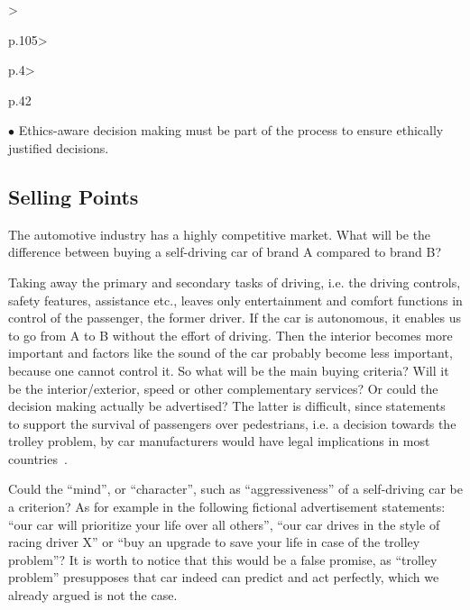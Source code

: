 \begin{table}[t]
\begin{small}
\begin{supertabular}{%
		>{\raggedright}p{.105\textwidth}>{\raggedright}p{.4\textwidth}>{\raggedright}p{.42\textwidth}}
				\noindent $\bullet$ Ethics-aware decision making must be part of the process to ensure ethically justified decisions.
 			 \tabularnewline 					
			\bottomrule
		\end{supertabular}
	\end{small}
	
\end{table}

\subsection{Selling Points}
\label{sec:EAofNONTC:SellingPoints}

The automotive industry has a highly competitive market. What will be the difference between buying a self-driving car of brand A compared to brand B? 

Taking away the primary and secondary tasks of driving, i.e. the driving controls, safety features, assistance etc., leaves only entertainment and comfort functions in control of the passenger, the former driver. If the car is autonomous, it enables us to go from A to B without the effort of driving. Then the interior becomes more important and factors like the sound of the car probably become less important, because one cannot control it. So what will be the main buying criteria? Will it be the interior/exterior, speed or other complementary services? Or could the decision making actually be advertised? %
The latter is difficult, since statements~\cite{CarAndDriverTaylor2016} to support the survival of passengers over pedestrians, i.e. a decision towards the trolley problem, by car manufacturers would have legal implications in most countries~\cite{Daimler2016pr}. %

Could the \enquote{mind}, or \enquote{character}, such as \enquote{aggressiveness} of a self-driving car be a criterion? As for example in the following fictional advertisement statements: \enquote{our car will prioritize your life over all others}, \enquote{our car drives in the style of racing driver X} or \enquote{buy an upgrade to save your life in case of the trolley problem}? It is worth to notice that this would be a false promise, as \enquote{trolley problem} presupposes that car indeed can predict and act perfectly, which we already argued is not the case.

